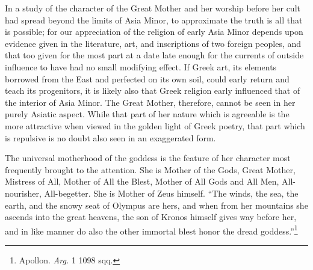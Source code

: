 \documentclass[a4paper, 11pt, oneside, polutonikogreek, french]{article}
\begin{document}
In a study of the character of the Great Mother and her worship before her cult had spread beyond the limits of Asia Minor, to approximate the truth is all that is possible; for our appreciation of the religion of early Asia Minor depends upon evidence given in the literature, art, and inscriptions of two foreign peoples, and that too given for the most part at a date late enough for the currents of outside influence to have had no small modifying effect. If Greek art, its elements borrowed from the East and perfected on its own soil, could early return and teach its progenitors, it is likely also that Greek religion early influenced that of the interior of Asia Minor. The Great Mother, therefore, cannot be seen in her purely Asiatic aspect. While that part of her nature which is agreeable is the more attractive when viewed in the golden light of Greek poetry, that part which is repulsive is no doubt also seen in an exaggerated form.

The universal motherhood of the goddess is the feature of her character most frequently brought to the attention. She is Mother of the Gods, Great Mother, Mistress of All, Mother of All the Blest, Mother of All Gods and All Men, All-nourisher, All-begetter. She is Mother of Zeus himself. ``The winds, the sea, the earth, and the snowy seat of Olympus are hers, and when from her mountains she ascends into the great heavens, the son of Kronos himself gives way before her, and in like manner do also the other immortal blest honor the dread goddess.''\footnote{Apollon. \emph{Arg.} 1 1098 sqq.}
\end{document}
